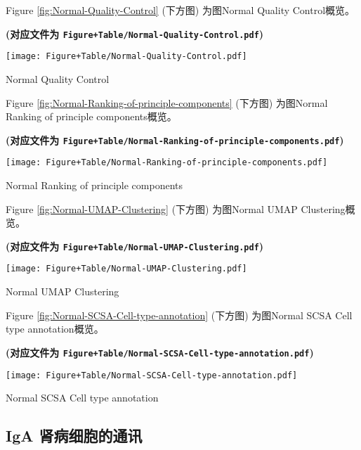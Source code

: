 \documentclass[
]{article}
\begin{document}
Figure \ref{fig:Normal-Quality-Control} (下方图) 为图Normal Quality Control概览。

\textbf{(对应文件为 \texttt{Figure+Table/Normal-Quality-Control.pdf})}

\def\@captype{figure}
\begin{center}
\texttt{[image: Figure+Table/Normal-Quality-Control.pdf]}
\caption{Normal Quality Control}\label{fig:Normal-Quality-Control}
\end{center}

Figure \ref{fig:Normal-Ranking-of-principle-components} (下方图) 为图Normal Ranking of principle components概览。

\textbf{(对应文件为 \texttt{Figure+Table/Normal-Ranking-of-principle-components.pdf})}

\def\@captype{figure}
\begin{center}
\texttt{[image: Figure+Table/Normal-Ranking-of-principle-components.pdf]}
\caption{Normal Ranking of principle components}\label{fig:Normal-Ranking-of-principle-components}
\end{center}

Figure \ref{fig:Normal-UMAP-Clustering} (下方图) 为图Normal UMAP Clustering概览。

\textbf{(对应文件为 \texttt{Figure+Table/Normal-UMAP-Clustering.pdf})}

\def\@captype{figure}
\begin{center}
\texttt{[image: Figure+Table/Normal-UMAP-Clustering.pdf]}
\caption{Normal UMAP Clustering}\label{fig:Normal-UMAP-Clustering}
\end{center}

Figure \ref{fig:Normal-SCSA-Cell-type-annotation} (下方图) 为图Normal SCSA Cell type annotation概览。

\textbf{(对应文件为 \texttt{Figure+Table/Normal-SCSA-Cell-type-annotation.pdf})}

\def\@captype{figure}
\begin{center}
\texttt{[image: Figure+Table/Normal-SCSA-Cell-type-annotation.pdf]}
\caption{Normal SCSA Cell type annotation}\label{fig:Normal-SCSA-Cell-type-annotation}
\end{center}

\hypertarget{iga-ux80beux75c5ux7ec6ux80deux7684ux901aux8baf}{%
\subsection{IgA 肾病细胞的通讯}\label{iga-ux80beux75c5ux7ec6ux80deux7684ux901aux8baf}}
\end{document}
